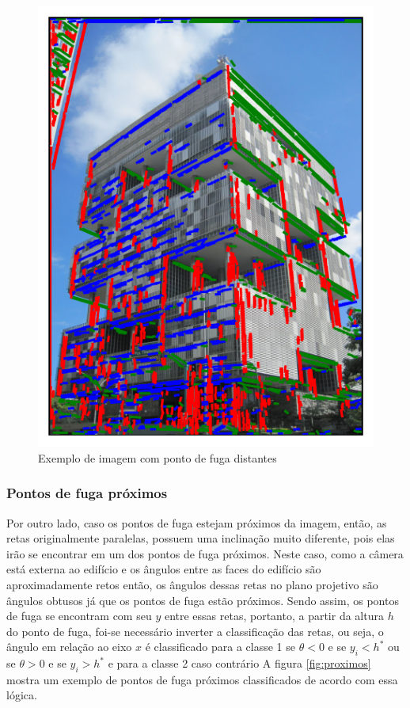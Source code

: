 \documentclass[12pt]{article}
\begin{document}
\begin{figure}[H]
    \centering
    \includegraphics[scale=0.80]{normal.pdf}
    \caption{Exemplo de imagem com ponto de fuga distantes}
    \label{fig:normal}
\end{figure}


\subsubsection{Pontos de fuga próximos}

Por outro lado, caso os pontos de fuga estejam próximos da imagem, então, as retas originalmente paralelas, possuem uma inclinação muito diferente, pois elas irão se encontrar em um dos pontos de fuga próximos. Neste caso, como a câmera está externa ao edifício e os ângulos entre as faces do edifício são aproximadamente retos então, os ângulos dessas retas no plano projetivo são ângulos obtusos já que os pontos de fuga estão próximos. Sendo assim, os pontos de fuga se encontram com seu $y$ entre essas retas, portanto, a partir da altura $h$ do ponto de fuga, foi-se necessário inverter a classificação das retas, ou seja, o ângulo em relação ao eixo $x$ é classificado para a classe 1 se $\theta < 0$ e se $y_i < h^*$ ou se $\theta > 0$ e se $y_i > h^*$ e para a classe 2 caso contrário A figura \ref{fig:proximos} mostra um exemplo de pontos de fuga próximos classificados de acordo com essa lógica.
\end{document}
